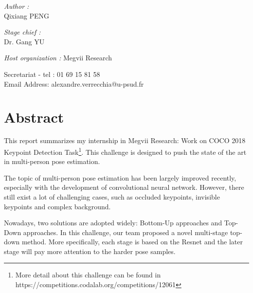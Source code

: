 \documentclass[oneside]{memoir}
\begin{document}
\begin{titlingpage}
\begin{center}
\begin{minipage}{0.4\textwidth}
\begin{flushleft} \large
\emph{Author :}\\
Qixiang \textsc{PENG}
\end{flushleft}
\end{minipage}
\begin{minipage}{0.4\textwidth}
\begin{flushright} \large
\emph{Stage chief :} \\
Dr. Gang \textsc{YU}
\end{flushright}
\end{minipage}
\vfill
\emph{Host organization : }
Megvii Research


\vfill



{Secretariat - tel : 01 69 15 81 58\\
Email Address: alexandre.verrecchia@u-psud.fr\\
}
\end{center}

\end{titlingpage}



\tableofcontents

\newpage
\thispagestyle{empty}%
\newpage

\chapter*{Abstract}

This report summarizes my internship in Megvii Research: Work on COCO 2018 Keypoint Detection Task\footnote{ More detail about this challenge can be found in https://competitions.codalab.org/competitions/12061}.
This challenge is designed to push the state of the art in multi-person pose estimation.

The topic of multi-person pose estimation has been largely improved recently, especially with the development of convolutional neural network.
However, there still exist a lot of challenging cases, such as occluded keypoints, invisible keypoints and complex background.

Nowadays, two solutions are adopted widely: Bottom-Up approaches and Top-Down approaches.
In this challenge, our team proposed a novel multi-stage top-down method.
More specifically, each stage is based on the Resnet and the later stage will pay more attention to the harder pose samples.
\end{document}
